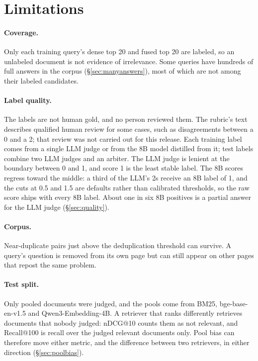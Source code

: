 \section*{Limitations}

\paragraph{Coverage.} Only each training query's dense top 20 and fused top 20 are labeled, so an unlabeled document is not evidence of irrelevance. Some queries have hundreds of full answers in the corpus (\S\ref{sec:manyanswers}), most of which are not among their labeled candidates.

\paragraph{Label quality.} The labels are not human gold, and no person reviewed them. The rubric's text describes qualified human review for some cases, such as disagreements between a 0 and a 2; that review was not carried out for this release. Each training label comes from a single LLM judge or from the 8B model distilled from it; test labels combine two LLM judges and an arbiter. The LLM judge is lenient at the boundary between 0 and 1, and score 1 is the least stable label. The 8B scores regress toward the middle: a third of the LLM's 2s receive an 8B label of 1, and the cuts at 0.5 and 1.5 are defaults rather than calibrated thresholds, so the raw score ships with every 8B label. About one in six 8B positives is a partial answer for the LLM judge (\S\ref{sec:quality}).

\paragraph{Corpus.} Near-duplicate pairs just above the deduplication threshold can survive. A query's question is removed from its own page but can still appear on other pages that repost the same problem.

\paragraph{Test split.} Only pooled documents were judged, and the pools come from BM25, bge-base-en-v1.5 and Qwen3-Embedding-4B. A retriever that ranks differently retrieves documents that nobody judged: nDCG@10 counts them as not relevant, and Recall@100 is recall over the judged relevant documents only. Pool bias can therefore move either metric, and the difference between two retrievers, in either direction (\S\ref{sec:poolbias}).
